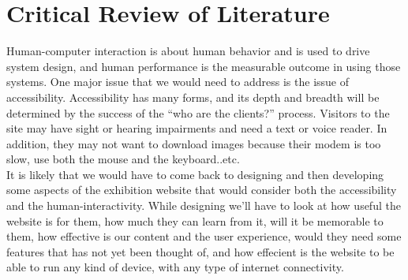 \section{Critical Review of Literature}

Human-computer interaction is about human behavior and is used to drive system design, and human performance is the measurable outcome in using those systems. One major issue that we would need to address is the issue of accessibility. Accessibility has many forms, and its depth and breadth will be determined by the success of the “who are the clients?” process. Visitors to the site may have sight or hearing impairments and need a text or voice reader. In addition, they may not want to download images because their modem is too slow, use both the mouse and the keyboard..etc.
\\It is likely that we would have to come back to designing and then developing some aspects of the exhibition website that would consider both the accessibility and the human-interactivity. While designing we'll have to look at how useful the website is for them, how much they can learn from it, will it be memorable to them, how effective is our content and the user experience, would they need some features that has not yet been thought of, and how effecient is the website to be able to run any kind of device, with any type of internet connectivity.